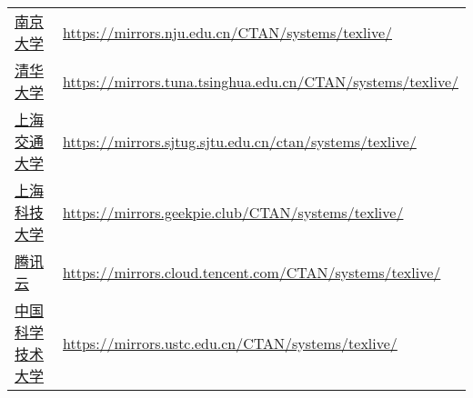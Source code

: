 \begin{table}[!hb]
\begin{tabular}{*{2}{l}}
      \href{https://mirrors.nju.edu.cn/}{南京大学}
      & \url{https://mirrors.nju.edu.cn/CTAN/systems/texlive/}\\
      \href{https://mirrors.tuna.tsinghua.edu.cn/}{清华大学}
      & \url{https://mirrors.tuna.tsinghua.edu.cn/CTAN/systems/texlive/}\\
      \href{https://mirrors.sjtug.sjtu.edu.cn/}{上海交通大学}
      & \url{https://mirrors.sjtug.sjtu.edu.cn/ctan/systems/texlive/}\\
      \href{https://mirrors.geekpie.club/}{上海科技大学}
      & \url{https://mirrors.geekpie.club/CTAN/systems/texlive/}\\
      \href{https://mirrors.cloud.tencent.com/}{腾讯云}
      & \url{https://mirrors.cloud.tencent.com/CTAN/systems/texlive/}\\
      \href{https://mirrors.ustc.edu.cn/}{中国科学技术大学}
      & \url{https://mirrors.ustc.edu.cn/CTAN/systems/texlive/}\\
      \bottomrule
    \end{tabular}
\end{table}